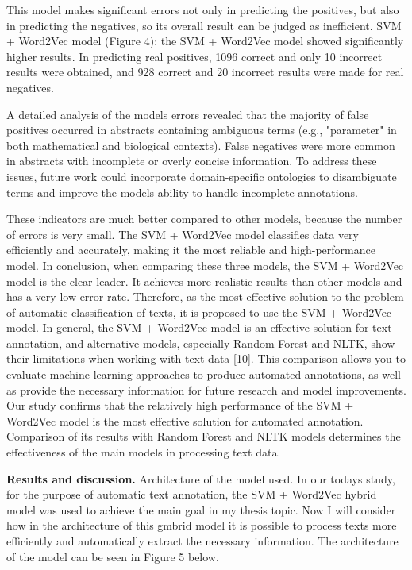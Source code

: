 \documentclass[
]{article}
\begin{document}
This model makes significant errors not only in predicting the
positives, but also in predicting the negatives, so its overall result
can be judged as inefficient. SVM + Word2Vec model (Figure 4): the SVM +
Word2Vec model showed significantly higher results. In predicting real
positives, 1096 correct and only 10 incorrect results were obtained, and
928 correct and 20 incorrect results were made for real negatives.

A detailed analysis of the model\textquotesingle s errors revealed that
the majority of false positives occurred in abstracts containing
ambiguous terms (e.g., "parameter" in both mathematical and biological
contexts). False negatives were more common in abstracts with incomplete
or overly concise information. To address these issues, future work
could incorporate domain-specific ontologies to disambiguate terms and
improve the model\textquotesingle s ability to handle incomplete
annotations.

These indicators are much better compared to other models, because the
number of errors is very small. The SVM + Word2Vec model classifies data
very efficiently and accurately, making it the most reliable and
high-performance model. In conclusion, when comparing these three
models, the SVM + Word2Vec model is the clear leader. It achieves more
realistic results than other models and has a very low error rate.
Therefore, as the most effective solution to the problem of automatic
classification of texts, it is proposed to use the SVM + Word2Vec model.
In general, the SVM + Word2Vec model is an effective solution for text
annotation, and alternative models, especially Random Forest and NLTK,
show their limitations when working with text data {[}10{]}. This
comparison allows you to evaluate machine learning approaches to produce
automated annotations, as well as provide the necessary information for
future research and model improvements. Our study confirms that the
relatively high performance of the SVM + Word2Vec model is the most
effective solution for automated annotation. Comparison of its results
with Random Forest and NLTK models determines the effectiveness of the
main models in processing text data.

\textbf{Results and discussion.} Architecture of the model used. In our
today\textquotesingle s study, for the purpose of automatic text
annotation, the SVM + Word2Vec hybrid model was used to achieve the main
goal in my thesis topic. Now I will consider how in the architecture of
this gmbrid model it is possible to process texts more efficiently and
automatically extract the necessary information. The architecture of the
model can be seen in Figure 5 below.
\end{document}
